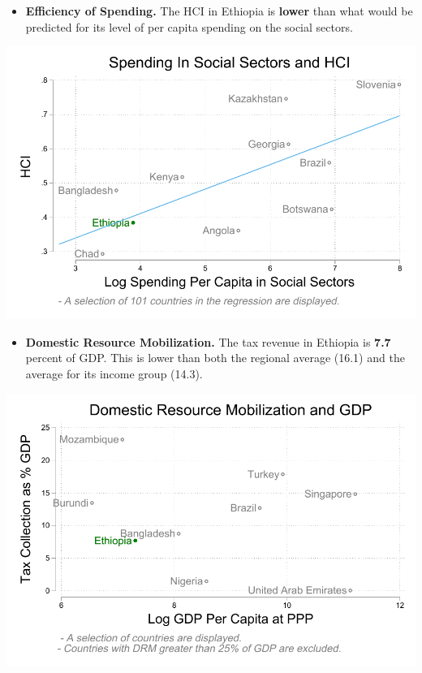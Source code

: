 \documentclass[9.2pt,twocolumn]{article}
\providecommand{\tightlist}{%
  \setlength{\itemsep}{0pt}\setlength{\parskip}{0pt}}
\begin{document}
\begin{itemize}
\tightlist
\item
  \textbf{Efficiency of Spending.} The HCI in Ethiopia is \textbf{lower}
  than what would be predicted for its level of per capita spending on
  the social sectors.
\end{itemize}

\begin{center}\includegraphics[width=1\linewidth,height=0.5\textheight]{charts/efficiency_ETH} \end{center}

\begin{itemize}
\tightlist
\item
  \textbf{Domestic Resource Mobilization.} The tax revenue in Ethiopia
  is \textbf{7.7} percent of GDP. This is lower than both the regional
  average (16.1) and the average for its income group (14.3).
\end{itemize}

\begin{flushright}\includegraphics[width=1\linewidth,height=0.5\textheight]{charts/drm_ETH} \end{flushright}
\end{document}
